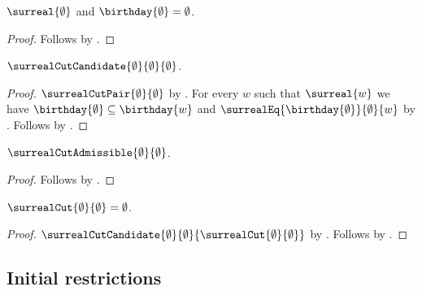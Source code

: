 \begin{proposition}\label{empty_surreal}
    $\surreal{\emptyset}$ and $\birthday{\emptyset}=\emptyset$.
\end{proposition}
\begin{proof}
    Follows by .
\end{proof}

\begin{proposition}\label{empty_surreal_cut_candidate}
    $\surrealCutCandidate{\emptyset}{\emptyset}{\emptyset}$.
\end{proposition}
\begin{proof}
    $\surrealCutPair{\emptyset}{\emptyset}$
        by .
    For every $w$ such that $\surreal{w}$ we have
        $\birthday{\emptyset}\subseteq\birthday{w}$ and
        $\surrealEq{\birthday{\emptyset}}{\emptyset}{w}$
        by .
    Follows by
        .
\end{proof}

\begin{proposition}\label{empty_surreal_cut_admissible}
    $\surrealCutAdmissible{\emptyset}{\emptyset}$.
\end{proposition}
\begin{proof}
    Follows by
        .
\end{proof}

\begin{proposition}\label{empty_surreal_cut}
    $\surrealCut{\emptyset}{\emptyset}=\emptyset$.
\end{proposition}
\begin{proof}
    $\surrealCutCandidate{\emptyset}{\emptyset}
        {\surrealCut{\emptyset}{\emptyset}}$
        by .
    Follows by
        .
\end{proof}

\subsection{Initial restrictions}

